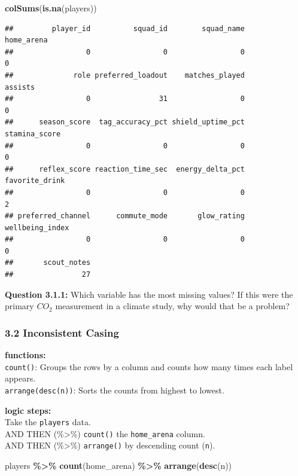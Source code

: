 \documentclass[
]{article}
\newenvironment{Shaded}{\begin{snugshade}}{\end{snugshade}}
\newcommand{\FunctionTok}[1]{\textcolor[rgb]{0.13,0.29,0.53}{\textbf{#1}}}
\newcommand{\NormalTok}[1]{#1}
\newcommand{\SpecialCharTok}[1]{\textcolor[rgb]{0.81,0.36,0.00}{\textbf{#1}}}
\begin{document}
\begin{Shaded}
\begin{Highlighting}[]
\FunctionTok{colSums}\NormalTok{(}\FunctionTok{is.na}\NormalTok{(players))}
\end{Highlighting}
\end{Shaded}

\begin{verbatim}
##         player_id          squad_id        squad_name        home_arena 
##                 0                 0                 0                 0 
##              role preferred_loadout    matches_played           assists 
##                 0                31                 0                 0 
##      season_score  tag_accuracy_pct shield_uptime_pct     stamina_score 
##                 0                 0                 0                 0 
##      reflex_score reaction_time_sec  energy_delta_pct    favorite_drink 
##                 0                 0                 0                 2 
## preferred_channel      commute_mode       glow_rating   wellbeing_index 
##                 0                 0                 0                 0 
##       scout_notes 
##                27
\end{verbatim}

\textbf{Question 3.1.1:} Which variable has the most missing values? If
this were the primary \(CO_2\) measurement in a climate study, why would
that be a problem?

\subsubsection{3.2 Inconsistent Casing}\label{inconsistent-casing}

\textbf{functions:}\\
\texttt{count()}: Groups the rows by a column and counts how many times
each label appears.\\
\texttt{arrange(desc(n))}: Sorts the counts from highest to lowest.

\textbf{logic steps:}\\
Take the \texttt{players} data.\\
AND THEN (\%\textgreater\%) \texttt{count()} the \texttt{home\_arena}
column.\\
AND THEN (\%\textgreater\%) \texttt{arrange()} by descending count
(\texttt{n}).

\begin{Shaded}
\begin{Highlighting}[]
\NormalTok{players }\SpecialCharTok{\%\textgreater{}\%}
  \FunctionTok{count}\NormalTok{(home\_arena) }\SpecialCharTok{\%\textgreater{}\%}
  \FunctionTok{arrange}\NormalTok{(}\FunctionTok{desc}\NormalTok{(n))}
\end{Highlighting}
\end{Shaded}
\end{document}

